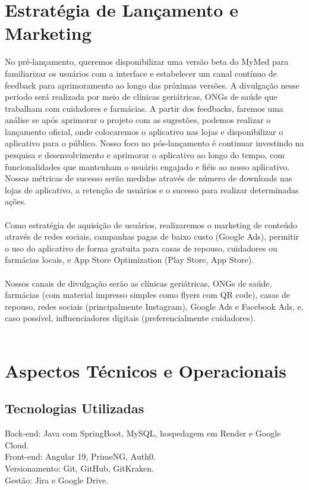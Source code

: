 \section{Estratégia de Lançamento e Marketing}
No pré-lançamento, queremos disponibilizar uma versão beta do MyMed para familiarizar os usuários com a interface e estabelecer um canal contínuo de feedback para aprimoramento ao longo das próximas versões. A divulgação nesse período será realizada por meio de clínicas geriátricas, ONGs de saúde que trabalham com cuidadores e farmácias. A partir dos feedbacks, faremos uma análise se após aprimorar o projeto com as sugestões, podemos realizar o lançamento oficial, onde colocaremos o aplicativo nas lojas e disponibilizar o aplicativo para o público. Nosso foco no pós-lançamento é continuar investindo na pesquisa e desenvolvimento e aprimorar o aplicativo ao longo do tempo, com funcionalidades que mantenham o usuário engajado e fiéis ao nosso aplicativo. Nossas métricas de sucesso serão medidas através de número de downloads nas lojas de aplicativo, a retenção de usuários e o sucesso para realizar determinadas ações. \\\\
Como estratégia de aquisição de usuários, realizaremos o marketing de conteúdo através de redes sociais, campanhas pagas de baixo custo (Google Ads), permitir o uso do aplicativo de forma gratuita para casas de repouso, cuidadores ou farmácias locais, e App Store Optimization (Play Store, App Store). \\\\
Nossos canais de divulgação serão as clínicas geriátricas, ONGs de saúde, farmácias (com material impresso simples como flyers com QR code), casas de repouso, redes sociais (principalmente Instagram), Google Ads e Facebook Ads, e, caso possível, influenciadores digitais (preferencialmente cuidadores).\\\\

\section{Aspectos Técnicos e Operacionais}

\subsection*{Tecnologias Utilizadas}
Back-end: Java com SpringBoot, MySQL, hospedagem em Render e Google Cloud. \\
Front-end: Angular 19, PrimeNG, Auth0. \\
Versionamento: Git, GitHub, GitKraken. \\
Gestão: Jira e Google Drive.


